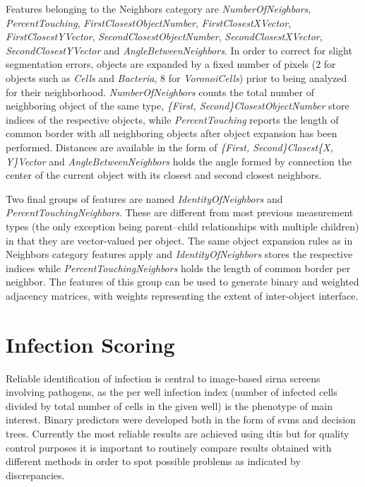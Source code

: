 Features belonging to the Neighbors category are \textit{NumberOfNeighbors}, \textit{PercentTouching}, \textit{FirstClosestObjectNumber}, \textit{FirstClosestXVector}, \textit{FirstClosestYVector}, \textit{SecondClosestObjectNumber}, \textit{SecondClosestXVector}, \textit{SecondClosestYVector} and \textit{AngleBetweenNeighbors}. In order to correct for slight segmentation errors, objects are expanded by a fixed number of pixels (2 for objects such as \textit{Cells} and \textit{Bacteria}, 8 for \textit{VoronoiCells}) prior to being analyzed for their neighborhood. \textit{NumberOfNeighbors} counts the total number of neighboring object of the same type, \textit{\{First, Second\}ClosestObjectNumber} store indices of the respective objects, while \textit{PercentTouching} reports the length of common border with all neighboring objects after object expansion has been performed. Distances are available in the form of \textit{\{First, Second\}Closest\{X, Y\}Vector} and \textit{AngleBetweenNeighbors} holds the angle formed by connection the center of the current object with its closest and second closest neighbors.

Two final groups of features are named \textit{IdentityOfNeighbors} and \textit{PercentTouchingNeighbors}. These are different from most previous measurement types (the only exception being parent--child relationships with multiple children) in that they are vector-valued per object. The same object expansion rules as in Neighbors category features apply and \textit{IdentityOfNeighbors} stores the respective indices while \textit{PercentTouchingNeighbors} holds the length of common border per neighbor. The features of this group can be used to generate binary and weighted adjacency matrices, with weights representing the extent of inter-object interface.

\section{Infection Scoring}
\label{sec:infection-scoring}
Reliable identification of infection is central to image-based \gls{sirna} screens involving pathogens, as the per well infection index (number of infected cells divided by total number of cells in the given well) is the phenotype of main interest. Binary predictors were developed both in the form of \glspl{svm} and decision trees. Currently the most reliable results are achieved using \gls{dtis} but for quality control purposes it is important to routinely compare results obtained with different methods in order to spot possible problems as indicated by discrepancies.

